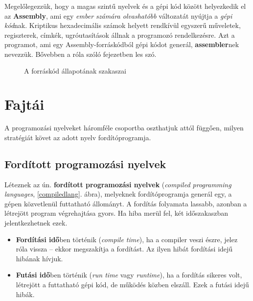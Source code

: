 Megelőlegezzük, hogy a magas szintű nyelvek és a gépi kód között helyezkedik el az \textbf{Assembly}, ami egy \textit{ember számára olvashatóbb} változatát nyújtja a \textit{gépi kód}nak. Kriptikus hexadecimális számok helyett rendkívül egyszerű műveletek, regiszterek, címkék, ugróutasítások állnak a programozó rendelkezésre. Azt a programot, ami egy Assembly-forráskódból gépi kódot generál, \textbf{assembler}nek nevezzük. Bővebben a róla szóló fejezetben les szó.

\begin{figure}
	\centering
	\caption{A forráskód állapotának szakaszai}
\end{figure}

\section{Fajtái}

A programozási nyelveket háromféle csoportba oszthatjuk attól függően, milyen stratégiát követ az adott nyelv fordítóprogramja.

\subsection{Fordított programozási nyelvek}

Léteznek az ún. \textbf{fordított programozási nyelvek} (\textit{compiled programming languages}, \ref{compiledlang}. ábra), melyeknek fordítóprogramja generál egy, a gépen közvetlenül futtatható állományt. A fordítás folyamata lassabb, azonban a létrejött program végrehajtása gyors. Ha hiba merül fel, két időszakaszban jelentkezhetnek ezek.
\begin{itemize}
	\item \textbf{Fordítási idő}ben történik (\textit{compile time}), ha a compiler veszi észre, jelez róla vissza -- ekkor megszakítja a fordítást. Az ilyen hibát fordítási idejű hibának hívjuk.
	\item \textbf{Futási idő}ben történik (\textit{run time} vagy \textit{runtime}), ha a fordítás sikeres volt, létrejött a futtatható gépi kód, de működés közben elszáll. Ezek a futási idejű hibák.
\end{itemize}

